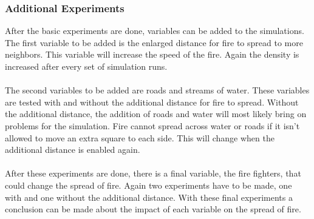 \documentclass{article}
\begin{document}
\begin{multicols}{2}
\subsubsection*{Additional Experiments}
After the basic experiments are done, variables can be added to the simulations. The first variable to be added is the enlarged distance for fire to spread to more neighbors. This variable will increase the speed of the fire. Again the density is increased after every set of simulation runs.\\\\
The second variables to be added are roads and streams of water. These variables are tested with and without the additional distance for fire to spread. Without the additional distance, the addition of roads and water will most likely bring on problems for the simulation. Fire cannot spread across water or roads if it isn't allowed to move an extra square to each side. This will change when the additional distance is enabled again.\\\\
After these experiments are done, there is a final variable, the fire fighters, that could change the spread of fire. Again two experiments have to be made, one with and one without the additional distance. With these final experiments a conclusion can be made about the impact of each variable on the spread of fire.


\end{multicols}
\end{document}
